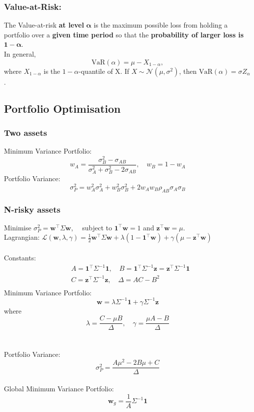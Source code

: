 \documentclass[11pt]{article}
\begin{document}
	\subsubsection{Value-at-Risk:}
	The Value-at-risk \textbf{at level }\( \bm{\alpha} \) is the maximum possible loss from holding a portfolio over a \textbf{given time period} so that the \textbf{probability of larger loss is} \(\bm{1 - \alpha}  \).\\
	In general, 
	\[	\text{VaR}(\alpha) = \mu - X_{1 - \alpha},
		\]
	where \( X_{1-\alpha} \) is the \( 1 - \alpha \)-quantile of X.
	If \( X\sim\mathcal{N}(\mu, \sigma^2) \), then 
	\(	\text{VaR}(\alpha) = \sigma Z_{\alpha}
		\).
	\subsection{Portfolio Optimisation}
	\subsubsection{Two assets}
	Minimum Variance Portfolio: \[	w_A = \frac{\sigma^2_B - \sigma_{AB}}{\sigma^2_A + \sigma^2_B - 2\sigma_{AB}},\quad w_B = 1 - w_A\]
	Portfolio Variance:
	\[	\sigma_P^2 = w_A^2 \sigma_A^2 + w_B^2 \sigma_B^2 + 2w_A w_B\rho_{AB}\sigma_{A}\sigma_B\]
	
	\subsubsection{N-risky assets}
	Minimise \( \displaystyle\sigma_P^2 = \bm{w}^{\top} \Sigma \bm{w} \), \( \quad \)subject to \( \bm{1}^{\top}\bm{w}= 1 \) and \( \bm{z}^{\top}\bm{w}=\mu \).\\[5pt]
	Lagrangian: \( \mathcal{L}(\bm{w}, \lambda, \gamma)  = \frac{1}{2} \bm{w}^{\top} \Sigma \bm{w} + \lambda (1 - \bm{1}^{\top}\bm{w}) + \gamma (\mu - \bm{z}^{\top}\bm{w})\)\\\\
	Constants: \begin{align*}
				&	A = \bm{1}^{\top}\Sigma^{-1}\bm{1},\quad B =  \bm{1}^{\top}\Sigma^{-1}\bm{z} = \bm{z}^{\top}\Sigma^{-1}\bm{1}\\[2pt]
				&	C = \bm{z}^{\top}\Sigma^{-1}\bm{z}, \quad\Delta = AC - B^2\\
				\end{align*} 
	Minimum Variance Portfolio: 
	\[ \displaystyle\bm{w} = \lambda \Sigma^{-1} \bm{1} + \gamma \Sigma^{-1}\bm{z}  \]where \[ \lambda = \frac{C - \mu B}{\Delta}, \quad\gamma = \frac{\mu A - B}{\Delta} \]\\\\
	Portfolio Variance: \[ \sigma_P^2 = \frac{A\mu^2 -2B\mu + C}{\Delta} \]\\
	Global Minimum Variance Portfolio: \[ \bm{w}_g = \frac{1}{A}\Sigma^{-1}\bm{1} \]
	
\end{document}
